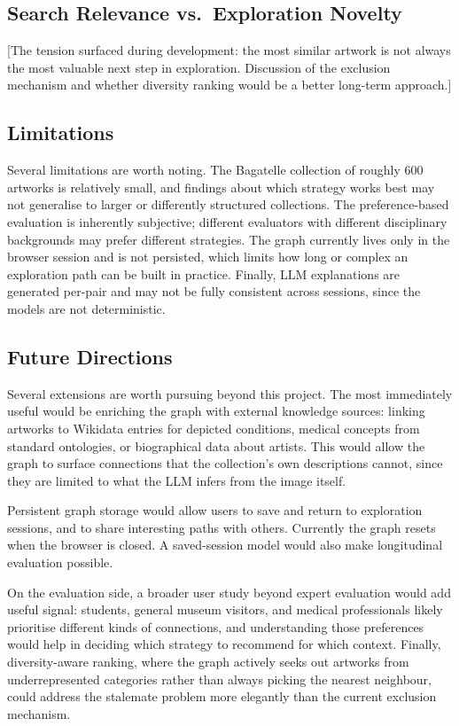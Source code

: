 \documentclass[12pt, a4paper]{article}
\begin{document}
\subsection{Search Relevance vs.\ Exploration Novelty}

[The tension surfaced during development: the most similar artwork is not always the most
valuable next step in exploration. Discussion of the exclusion mechanism and whether diversity
ranking would be a better long-term approach.]

\subsection{Limitations}

Several limitations are worth noting. The Bagatelle collection of roughly 600 artworks is
relatively small, and findings about which strategy works best may not generalise to larger or
differently structured collections. The preference-based evaluation is inherently subjective;
different evaluators with different disciplinary backgrounds may prefer different strategies.
The graph currently lives only in the browser session and is not persisted, which limits how
long or complex an exploration path can be built in practice. Finally, LLM explanations are
generated per-pair and may not be fully consistent across sessions, since the models are not
deterministic.

\subsection{Future Directions}

Several extensions are worth pursuing beyond this project. The most immediately useful would
be enriching the graph with external knowledge sources: linking artworks to Wikidata entries
for depicted conditions, medical concepts from standard ontologies, or biographical data about
artists. This would allow the graph to surface connections that the collection's own descriptions
cannot, since they are limited to what the LLM infers from the image itself.

Persistent graph storage would allow users to save and return to exploration sessions, and to
share interesting paths with others. Currently the graph resets when the browser is closed.
A saved-session model would also make longitudinal evaluation possible.

On the evaluation side, a broader user study beyond expert evaluation would add useful signal:
students, general museum visitors, and medical professionals likely prioritise different kinds of
connections, and understanding those preferences would help in deciding which strategy to
recommend for which context. Finally, diversity-aware ranking, where the graph actively seeks
out artworks from underrepresented categories rather than always picking the nearest neighbour,
could address the stalemate problem more elegantly than the current exclusion mechanism.
\end{document}
